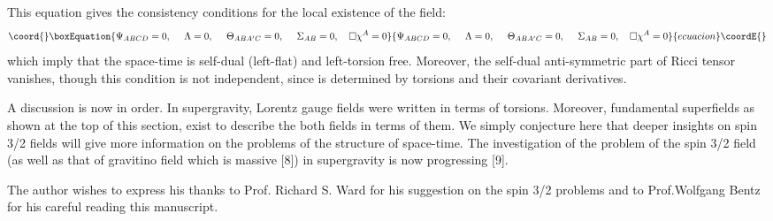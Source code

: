\documentclass[a4paper,12pt]{article}
\begin{document}
This equation gives the consistency conditions for the local existence of the \coordHE{} field:
\begin{equation}\coord{}\boxEquation{
\Psi_{ABCD}=0,\ \ \ \ \Lambda=0,\ \ \ \ \Theta_{ABA'C}=0,\ \ \ \ \Sigma_{AB}=0,\ \ \ \square\chi^{A}=0
}{
\Psi_{ABCD}=0,\ \ \ \ \Lambda=0,\ \ \ \ \Theta_{ABA'C}=0,\ \ \ \ \Sigma_{AB}=0,\ \ \ \square\chi^{A}=0
}{ecuacion}\coordE{}\end{equation}
which imply that the space-time is self-dual (left-flat) and left-torsion free. Moreover, the self-dual anti-symmetric part of Ricci tensor vanishes, though this condition is not independent, since \coordHE{} is determined by torsions and 
their covariant derivatives.

A discussion is now in order. In \coordHE{} supergravity, Lorentz gauge fields were written in terms of torsions. Moreover, fundamental superfields as shown at the top of this section, exist to describe the both fields in terms of them.
We simply conjecture here that deeper insights on spin 3/2 fields will give more information on the problems of the structure of space-time. The investigation of the problem of the spin 3/2 field (as well as that of gravitino field \coordHE{} which is massive [8]) in \coordHE{} supergravity is now progressing [9].

 The author wishes to express his thanks to Prof. Richard S. Ward for his suggestion on the spin 3/2 problems and to Prof.Wolfgang Bentz for his careful reading this manuscript. 
 
\end{document}

